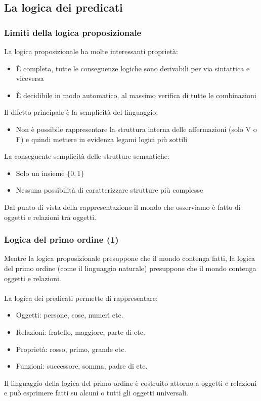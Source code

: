 \documentclass[../main.tex]{subfiles}
\begin{document}
	\subsection{La logica dei predicati}
	\subsubsection{Limiti della logica proposizionale}
	La logica proposizionale ha molte interessanti proprietà:
	\begin{itemize}
		\item È completa, tutte le conseguenze logiche sono derivabili per via sintattica e viceversa
		\item È decidibile in modo automatico, al massimo verifica di tutte le combinazioni
	\end{itemize}
	Il difetto principale è la semplicità del linguaggio:
	\begin{itemize}
		\item Non è possibile rappresentare la struttura interna delle affermazioni (solo V o F) e quindi mettere in evidenza legami logici più sottili
	\end{itemize}
	La conseguente semplicità delle strutture semantiche:
	\begin{itemize}
		\item Solo un insieme $\{0, 1\}$
		\item Nessuna possibilità di caratterizzare strutture più complesse
	\end{itemize}
	Dal punto di vista della rappresentazione il mondo che osserviamo è fatto di oggetti e relazioni tra oggetti.
	\subsubsection{Logica del primo ordine (1)}
	Mentre la logica proposizionale presuppone che il mondo contenga fatti, la logica del primo ordine (come il linguaggio naturale) presuppone che il mondo contenga oggetti e relazioni.\\\\
	La logica dei predicati permette di rappresentare:
	\begin{itemize}
		\item Oggetti: persone, cose, numeri etc.
		\item Relazioni: fratello, maggiore, parte di etc.
		\item Proprietà: rosso, primo, grande etc.
		\item Funzioni: successore, somma, padre di etc.
	\end{itemize}
	Il linguaggio della logica del primo ordine è costruito attorno a oggetti e relazioni e può esprimere fatti su alcuni o tutti gli oggetti universali.
\end{document}
